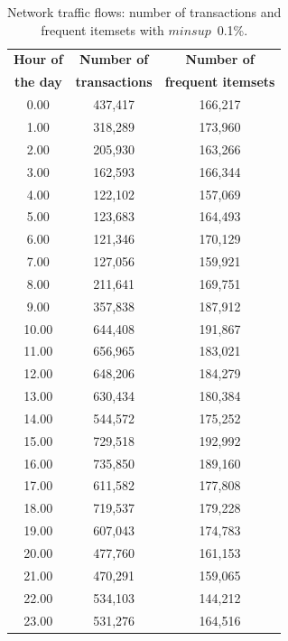 \begin{table}[h!]
\scriptsize
\begin{center}
\caption{Network traffic flows: number of transactions and frequent itemsets
with $minsup$~0.1\%.}
\label{netlog_itemsets}
\begin{tabular}{|c|c|c|}
\hline
{\bf Hour of}	& {\bf Number of} 	& {\bf	Number of} \\
{\bf the day}	& {\bf transactions} 	& {\bf	frequent itemsets} \\
\hline \hline
0.00  & 437,417 & 166,217 \\ \hline
1.00  & 318,289 & 173,960 \\ \hline
2.00  & 205,930 & 163,266 \\ \hline
3.00  & 162,593 & 166,344 \\ \hline
4.00  & 122,102 & 157,069 \\ \hline
5.00  & 123,683 & 164,493 \\ \hline
6.00  & 121,346 & 170,129 \\ \hline
7.00  & 127,056 & 159,921 \\ \hline
8.00  & 211,641 & 169,751 \\ \hline
9.00  & 357,838 & 187,912 \\ \hline
10.00 & 644,408 & 191,867 \\ \hline
11.00 & 656,965 & 183,021 \\ \hline
12.00 & 648,206 & 184,279 \\ \hline
13.00 & 630,434 & 180,384 \\ \hline
14.00 & 544,572 & 175,252 \\ \hline
15.00 & 729,518 & 192,992 \\ \hline
16.00 & 735,850 & 189,160 \\ \hline
17.00 & 611,582 & 177,808 \\ \hline
18.00 & 719,537 & 179,228 \\ \hline
19.00 & 607,043 & 174,783 \\ \hline
20.00 & 477,760 & 161,153 \\ \hline
21.00 & 470,291 & 159,065 \\ \hline
22.00 & 534,103 & 144,212 \\ \hline
23.00 & 531,276 & 164,516 \\ \hline
\end{tabular}
\end{center}
\end{table}

